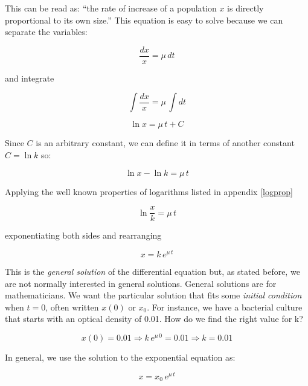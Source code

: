 \documentclass{tufte-book} %
\begin{document}
This can be read as: ``the rate of increase of a population $x$ is directly proportional to its own size.'' This equation is easy to solve because we can separate the variables:


\begin{equation}
	\frac{dx}{x} = \mu \, dt \nonumber
\end{equation}

and integrate

\begin{equation}
	\int \frac{dx}{x} = \mu \, \int  dt \nonumber
\end{equation}

\begin{equation}
	\ln{x} = \mu \, t + C \nonumber
\end{equation}

Since $C$ is an arbitrary constant, we can define it in terms of another constant $C= \ln{k}$ so:

\begin{equation}
	\ln{x} - \ln{k}  = \mu \, t  \nonumber
\end{equation}

Applying the well known properties of logarithms listed in appendix \ref{logprop}

\begin{equation}
	\ln{\frac{x}{k}}   = \mu \, t \nonumber
\end{equation}

exponentiating both sides and rearranging

\begin{equation}
	x   = k \, e^{\mu \, t} \nonumber
\end{equation}

This is the \emph{general solution} of the differential equation but, as stated before, we are not normally interested in general solutions. General solutions are for mathematicians. We want the particular solution that fits some \emph{initial condition} when $t=0$,  often written $x(0)$ or $x_0$. For instance, we have a bacterial culture that starts with an optical density of 0.01. How do we find the right value for k?


\begin{equation}
x(0) = 0.01 \Rightarrow	 k \, e^{\mu \, 0} = 0.01 \Rightarrow	k=0.01 \nonumber
\end{equation}

In general, we use the solution to the exponential equation as:

\begin{equation}
	x   = x_0 \, e^{\mu \, t} \nonumber
\end{equation}
\end{document}
